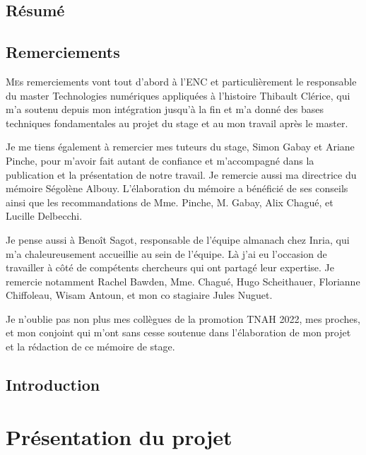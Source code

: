 \documentclass[a4paper,12pt,twoside]{book}
\begin{document}
	\frontmatter
	\cleardoublepage
	
	\chapter{Résumé}
	
	
	
	\chapter{Remerciements}
	\lettrine{M}es remerciements vont tout d'abord à l'\acrlong{ENC} et particulièrement le responsable du master Technologies numériques appliquées à l'histoire Thibault Clérice, qui m'a soutenu depuis mon intégration jusqu'à la fin et m'a donné des bases techniques fondamentales au projet du stage et au mon travail après le master.
	
	Je me tiens également à remercier mes tuteurs du stage, Simon Gabay et Ariane Pinche, pour m'avoir fait autant de confiance et m'accompagné dans la publication et la présentation de notre travail. Je remercie aussi ma directrice du mémoire Ségolène Albouy. L'élaboration du mémoire a bénéficié de ses conseils ainsi que les recommandations de Mme. Pinche, M. Gabay, Alix Chagué, et Lucille Delbecchi.
	
	Je pense aussi à Benoît Sagot, responsable de l'équipe \acrlong{almanach} chez \Gls{Inria}, qui m'a chaleureusement accueillie au sein de l'équipe. Là j'ai eu l'occasion de travailler à côté de compétents chercheurs qui ont partagé leur expertise. Je remercie notamment Rachel Bawden, Mme. Chagué, Hugo Scheithauer, Florianne Chiffoleau, Wisam Antoun, et mon co stagiaire Jules Nuguet.
	
	Je n'oublie pas non plus mes collègues de la promotion TNAH 2022, mes proches, et mon conjoint qui m'ont sans cesse soutenue dans l'élaboration de mon projet et la rédaction de ce mémoire de stage.
	
	\chapter{Introduction}
	
	
	\thispagestyle{empty}
	\cleardoublepage
	
	\mainmatter
	
	\part{Présentation du projet}
	\label{part1}
	
\end{document}
